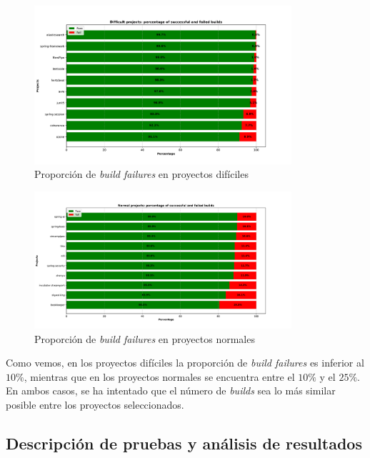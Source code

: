 \begin{figure}[H]
    \centering
    \includegraphics[width=0.85\textwidth]{images/Failures_difficult_projects.pdf}
    \caption{Proporción de \textit{build failures} en proyectos difíciles}
    \label{fig:failures_difficult_projects}
\end{figure}

\begin{figure}[H]
    \centering
    \includegraphics[width=0.85\textwidth]{images/Failures_normal_projects.pdf}
    \caption{Proporción de \textit{build failures} en proyectos normales}
    \label{fig:failures_normal_projects}
\end{figure}

Como vemos, en los proyectos difíciles la proporción de \textit{build failures} es inferior al
$10\%$, mientras que en los proyectos normales se encuentra entre el $10\%$ y el $25\%$. En
ambos casos, se ha intentado que el número de \textit{builds} sea lo más similar posible entre
los proyectos seleccionados.\\


\subsection{Descripción de pruebas y análisis de resultados}
